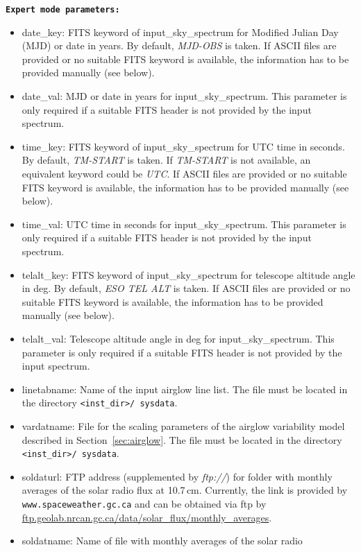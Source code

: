 {\bf\large\tt Expert mode parameters:}
\begin{itemize}
\item {\sc date\_key}: \ac{FITS} keyword of {\sc input\_sky\_spectrum} for
Modified Julian Day (MJD) or date in years. By default, {\it MJD-OBS} is taken.
If \ac{ASCII} files are provided or no suitable \ac{FITS} keyword is available,
the information has to be provided manually (see below).
\item {\sc date\_val}: MJD or date in years for {\sc input\_sky\_spectrum}.
This parameter is only required if a suitable \ac{FITS} header is not provided
by the input spectrum.
\item {\sc time\_key}: \ac{FITS} keyword of {\sc input\_sky\_spectrum} for UTC
time in seconds. By default, {\it TM-START} is taken. If {\it TM-START} is not
available, an equivalent keyword could be {\it UTC}. If \ac{ASCII} files are
provided or no suitable \ac{FITS} keyword is available, the information has to
be provided manually (see below).
\item {\sc time\_val}: UTC time in seconds for {\sc input\_sky\_spectrum}. This
parameter is only required if a suitable \ac{FITS} header is not provided by
the input spectrum.
\item {\sc telalt\_key}: \ac{FITS} keyword of {\sc input\_sky\_spectrum} for
telescope altitude angle in deg. By default, {\it ESO TEL ALT} is taken. If
\ac{ASCII} files are provided or no suitable \ac{FITS} keyword is available,
the information has to be provided manually (see below).
\item {\sc telalt\_val}: Telescope altitude angle in deg for
{\sc input\_sky\_spectrum}. This parameter is only required if a suitable
\ac{FITS} header is not provided by the input spectrum.
\item {\sc linetabname}: Name of the input airglow line list. The file must be
located in the directory {\tt <inst\_dir>/ sysdata}.
\item {\sc vardatname}: File for the scaling parameters of the airglow
variability model described in Section~\ref{sec:airglow}. The file must be
located in the directory {\tt <inst\_dir>/ sysdata}.
\item {\sc soldaturl}: FTP address (supplemented by {\it ftp://}) for folder
with monthly averages of the solar radio flux at 10.7\,cm. Currently, the link
is provided by {\tt www.spaceweather.gc.ca} and can be obtained via ftp by
\url{ftp.geolab.nrcan.gc.ca/data/solar_flux/monthly_averages}.
\item {\sc soldatname}: Name of file with monthly averages of the solar radio

\end{itemize}
